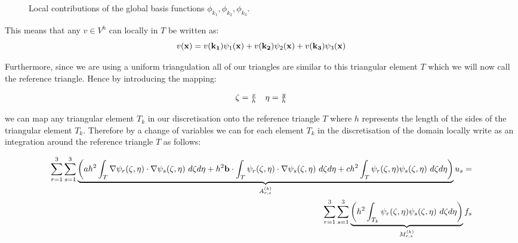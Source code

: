 \begin{figure}
\centering
\begin{subfigure}[b]{0.30\textwidth}
    \centering
    \resizebox{\linewidth}{!}{}
\end{subfigure}
\begin{subfigure}[b]{0.30\textwidth}
    \centering
    \resizebox{\linewidth}{!}{}
\end{subfigure}
\begin{subfigure}[b]{0.30\textwidth}
    \centering
    \resizebox{\linewidth}{!}{}
\end{subfigure}
\caption{Local contributions of the global basis functions
         $\phi_{k_1}, \phi_{k_2}, \phi_{k_3}$.}
\label{fig:twod-local-basis}
\end{figure}

This means that any $v \in V^h$ can locally in $T$ be written as:
\[
    v(\mathbf{x}) = v(\mathbf{k_1})\psi_1(\mathbf{x}) + v(\mathbf{k_2})\psi_2(\mathbf{x}) + v(\mathbf{k_3})\psi_3(\mathbf{x})
\]

Furthermore, since we are using a uniform triangulation all of our triangles
are similar to this triangular element $T$ which we will now call the reference
triangle. Hence by introducing the mapping:

\begin{align*}
 \begin{array}{c c}
    \zeta = \frac{x}{h} & \eta = \frac{y}{h}
 \end{array}
\end{align*}

we can map any triangular element $T_k$ in our discretisation onto the reference
triangle $T$ where $h$ represents the length of the sides of the triangular
element $T_k$. Therefore by a change of variables we can for each element $T_k$ in the discretisation of the
domain locally write  as an integration around the reference
triangle $T$ as follows:

\begin{align}\label{eq:twod-deterministic-discrete-local}
    \begin{split}
    \sum_{r=1}^3\sum_{s=1}^3\underbrace{
      \left(
        ah^2\int_{T}\nabla\psi_r(\zeta, \eta)\cdot\nabla\psi_s(\zeta, \eta)\ d\zeta d\eta
        + h^2\mathbf{b} \cdot \int_{T}\psi_r(\zeta,\eta)\cdot\nabla\psi_s(\zeta,\eta)\ d\zeta d\eta
        + ch^2\int_{T}\psi_r(\zeta,\eta)\psi_s(\zeta,\eta)\ d\zeta d\eta
      \right)}_{A^{(k)}_{r,s}}u_s = \\
    \sum_{r=1}^3\sum_{s=1}^3\underbrace{\left(
        h^2\int_{T_k}\psi_r(\zeta,\eta)\psi_s(\zeta,\eta)\ d\zeta d\eta
    \right)}_{M^{(k)}_{r,s}}f_s
    \end{split}
\end{align}

